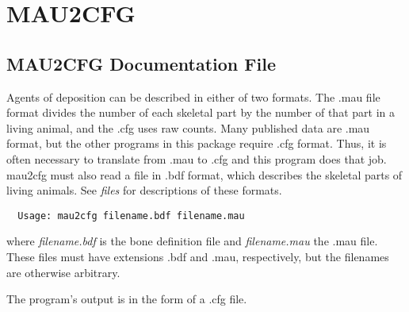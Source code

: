 
\section{MAU2CFG}%

\subsection*{MAU2CFG Documentation File}%

Agents of deposition can be described in either of two formats.  The
.mau file format divides the number of each skeletal part by the
number of that part in a living animal, and the .cfg uses raw counts.
Many published data are .mau format, but the other programs in this
package require .cfg format.  Thus, it is often necessary to translate
from .mau to .cfg and this program does that job.  mau2cfg must also
read a file in .bdf format, which describes the skeletal parts of
living animals.  See {\em files\/} for descriptions of these formats.
\begin{verbatim}
  Usage: mau2cfg filename.bdf filename.mau
\end{verbatim}

where {\em filename.bdf\/} is the bone definition file and {\em filename.mau\/}
the .mau file.  These files must have extensions .bdf and .mau,
respectively, but the filenames are otherwise arbitrary.

The program's output is in the form of a .cfg file.
